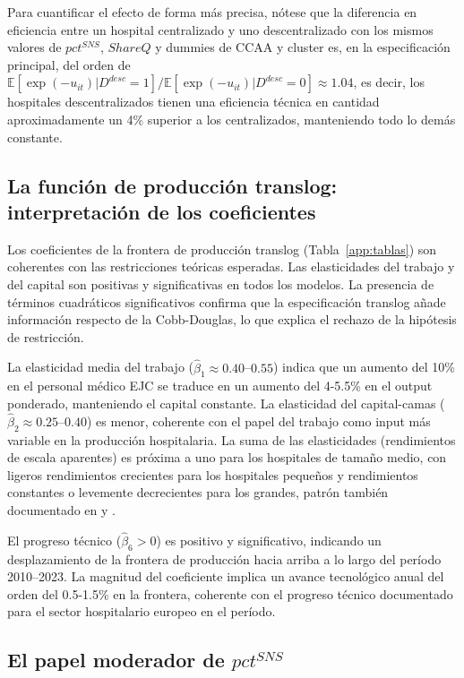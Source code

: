 \documentclass[12pt, a4paper, twoside, openright]{book}
\newcommand{\E}{\mathbb{E}}
\theoremstyle{plain}
\theoremstyle{definition}
\theoremstyle{remark}
\begin{document}
Para cuantificar el efecto de forma más precisa, nótese que la diferencia en eficiencia entre un hospital centralizado y uno descentralizado con los mismos valores de $pct^{SNS}$, $ShareQ$ y dummies de CCAA y cluster es, en la especificación principal, del orden de $\E[\exp(-u_{it})|D^{desc}=1] / \E[\exp(-u_{it})|D^{desc}=0] \approx 1.04$, es decir, los hospitales descentralizados tienen una eficiencia técnica en cantidad aproximadamente un 4\% superior a los centralizados, manteniendo todo lo demás constante.

\subsection{La función de producción translog: interpretación de los coeficientes}

Los coeficientes de la frontera de producción translog (Tabla~\ref{app:tablas}) son coherentes con las restricciones teóricas esperadas. Las elasticidades del trabajo y del capital son positivas y significativas en todos los modelos. La presencia de términos cuadráticos significativos confirma que la especificación translog añade información respecto de la Cobb-Douglas, lo que explica el rechazo de la hipótesis de restricción.

La elasticidad media del trabajo ($\hat{\beta}_1 \approx 0.40$--$0.55$) indica que un aumento del 10\% en el personal médico EJC se traduce en un aumento del 4-5.5\% en el output ponderado, manteniendo el capital constante. La elasticidad del capital-camas ($\hat{\beta}_2 \approx 0.25$--$0.40$) es menor, coherente con el papel del trabajo como input más variable en la producción hospitalaria. La suma de las elasticidades (rendimientos de escala aparentes) es próxima a uno para los hospitales de tamaño medio, con ligeros rendimientos crecientes para los hospitales pequeños y rendimientos constantes o levemente decrecientes para los grandes, patrón también documentado en \citet{linna1998} y \citet{farsi2005}.

El progreso técnico ($\hat{\beta}_6 > 0$) es positivo y significativo, indicando un desplazamiento de la frontera de producción hacia arriba a lo largo del período 2010--2023. La magnitud del coeficiente implica un avance tecnológico anual del orden del 0.5-1.5\% en la frontera, coherente con el progreso técnico documentado para el sector hospitalario europeo en el período.

\subsection{El papel moderador de \texorpdfstring{$pct^{SNS}$}{pct\^{}SNS}}
\end{document}
